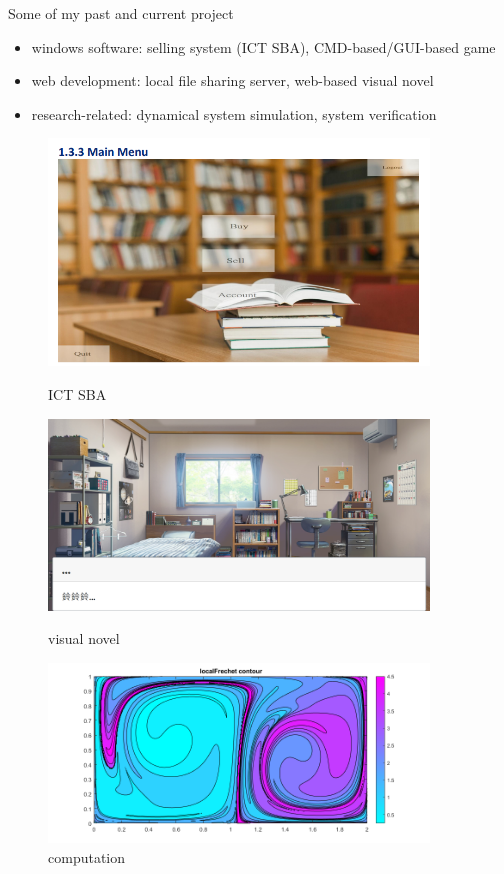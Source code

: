 \documentclass[10pt,xcolor={table,dvipsnames},t]{beamer}
\begin{document}
\begin{frame}{Some of my past and current project}
  \begin{itemize}
    \item windows software: selling system (ICT SBA), CMD-based/GUI-based game 
    \item web development: local file sharing server, web-based visual novel
    \item research-related: dynamical system simulation, system verification
  \end{itemize}
  \begin{figure}[h!]
    \centering
    \begin{minipage}{0.3\textwidth}
        \centering
        \includegraphics[width=0.9\textwidth]{proj1.png}
        \caption{ICT SBA}
    \end{minipage}\hfill
    \begin{minipage}{0.3\textwidth}
        \centering
        \includegraphics[width=0.9\textwidth]{proj2.png}
        \caption{visual novel}
    \end{minipage}\hfill
    \begin{minipage}{0.3\textwidth}
        \centering
        \includegraphics[width=0.9\textwidth]{proj3.png}
        \caption{computation}
    \end{minipage}
  \end{figure}
\end{frame}
\end{document}
